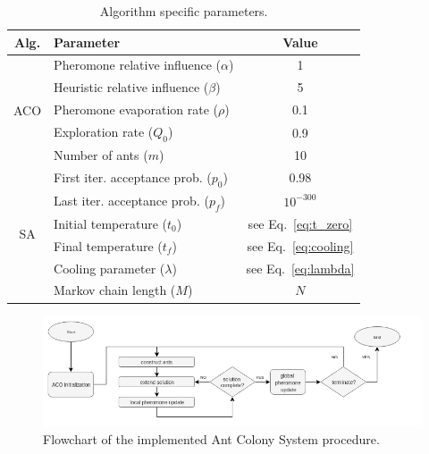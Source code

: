 \begin{table}[t]
\centering
\caption{Algorithm specific parameters.}
\label{tab:parameters}
\begin{tabular}{c l c}
\hline
Alg.    &           Parameter         &       Value \\ \hline
\multirow{5}{*}{ACO}    &           Pheromone relative influence ($\alpha$)              &         1 \\
                        &           Heuristic relative influence ($\beta$)               &         5 \\
                        &           Pheromone evaporation rate ($\rho$)                  &       0.1 \\
                        &           Exploration rate ($Q_0$)                  &       0.9 \\ 
                        &           Number of ants ($m$)                     & 10 \\ \hline
\multirow{6}{*}{SA}     &           First iter. acceptance prob. ($p_0$)                   & 0.98  \\ 
                        &           Last iter. acceptance prob. ($p_f$)                   & $10^{-300}$  \\
                        &           Initial temperature ($t_0$)                   & see Eq.~\ref{eq:t_zero} \\
                        &           Final temperature ($t_f$)                   & see Eq.~\ref{eq:cooling}  \\
                        &           Cooling parameter ($\lambda$)               & see Eq.~\ref{eq:lambda} \\
                        &           Markov chain length ($M$)                     & $N$ \\ \hline
                         
\end{tabular}
\end{table}



\begin{figure}[h]
  \centering
  \includegraphics[width=\textwidth]{./Figures/system_implementation/aco_flow.png}
  \caption{Flowchart of the implemented Ant Colony System procedure.}
  \label{fig:aco_flow}  
\end{figure}

